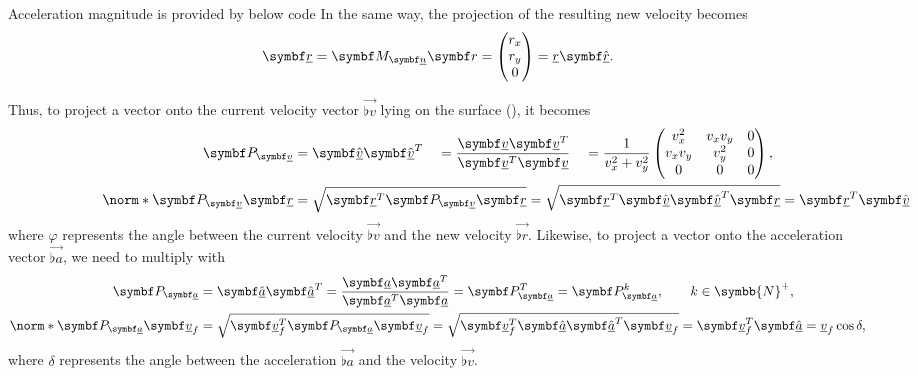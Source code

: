 Acceleration magnitude is provided by below code
In the same way, the projection of the resulting new velocity becomes
\begin{align*}
\vec{\flat{r}} = \resprojmat{\flat{n}} \vec{r} =
\begin{pmatrix}
r_x \\ r_y \\0
\end{pmatrix} = \flat{r} \uvec{\flat{r}}.
\end{align*}

Thus, to project a vector onto the current velocity vector $\vec{\flat{v}}$ lying on the surface (\greenarea), it becomes
\begin{alignat*}{4}
\projmat{\flat{v}} &= \uvec{\flat{v}} \uvec{\flat{v}}^T &&= \frac{\vec{\flat{v}} \vec{\flat{v}}^T}{\vec{\flat{v}}^T \vec{\flat{v}}} &&= \frac{1}{v_x^2 + v_y^2}
\begin{pmatrix}
v_x^2 & v_x v_y & 0\\
v_x v_y & v_y^2 & 0\\
0 & 0 & 0\\
\end{pmatrix},\\
%
\norm*{\projmat{\flat{v}} \vec{\flat{r}}} &= \mathmakebox[0pt][l]{\sqrt{\vec{\flat{r}}^T \projmat{\flat{v}} \vec{\flat{r}}} = \sqrt{\vec{\flat{r}}^T \uvec{\flat{v}} \uvec{\flat{v}}^T \vec{\flat{r}}} = \vec{\flat{r}}^T \uvec{\flat{v}} = \flat{r} \cos\varphi,}
\end{alignat*}
where $\varphi$ represents the angle between the current velocity $\vec{\flat{v}}$ and the new velocity $\vec{\flat{r}}$. Likewise, to project a vector onto the acceleration vector $\vec{\flat{a}}$, we need to multiply with
\begin{align*}
\projmat{\flat{a}} &= \uvec{\flat{a}} \uvec{\flat{a}}^T = \frac{\vec{\flat{a}} \vec{\flat{a}}^T}{\vec{\flat{a}}^T \vec{\flat{a}}} =
\projmat{\flat{a}}^T = \projmat{\flat{a}}^k, \qquad k \in \symbb{N}^+,\\
%
\norm*{\projmat{\flat{a}} \vec{\flat{v}}_f} &= \sqrt{\vec{\flat{v}}_f^T \projmat{\flat{a}} \vec{\flat{v}}_f} = \sqrt{\vec{\flat{v}}_f^T \uvec{\flat{a}} \uvec{\flat{a}}^T \vec{\flat{v}}_f} = \vec{\flat{v}}_f^T \uvec{\flat{a}} = \flat{v}_f \cos\delta,
\end{align*}
where $\delta$ represents the angle between the acceleration $\vec{\flat{a}}$ and the velocity $\vec{\flat{v}}$.
